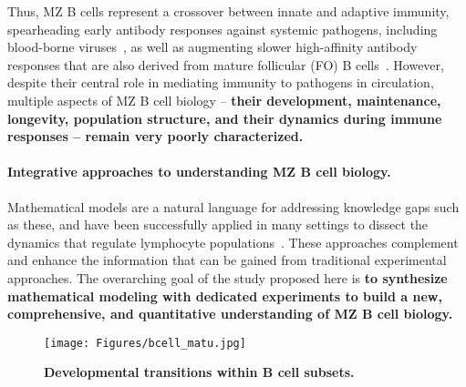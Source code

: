 \documentclass[11pt]{article}
\newcommand{\para}[1]{\vspace*{-4.5mm}\paragraph{#1}}
\begin{document}
Thus, MZ B cells represent a crossover between innate and adaptive immunity, spearheading early antibody responses against  systemic pathogens, including blood-borne viruses~\cite{Szomolanyi_Tsuda_1998, Gatto_2004}, as well as augmenting slower high-affinity antibody responses that are also derived from mature follicular (FO) B cells~\cite{Oliver_1999, Attanavanich_2004, Pone_2012}.
However, despite their central role in mediating immunity to pathogens in circulation, multiple aspects of MZ B cell biology -- \textbf{{their development, maintenance, longevity, population structure, and their dynamics during immune responses -- remain very poorly characterized.}}

\para{Integrative approaches to understanding MZ B cell biology.}
Mathematical models are a natural language for addressing knowledge gaps such as these, and have been successfully applied in many settings to dissect the dynamics that regulate lymphocyte populations~\cite{Thomas_Vaslin_1989, Rolink_1999, Asquith_2002, Antia_2005, Anderson_2009, Dowling_2009, Johnson_2012, Meyer-Hermann_2012, De_Boer_2013,  Westera_2013,   Gossel_2017, Hogan_2015, van_Hoeven_2017, Reynaldi_2019, Rane_2018, Mold_2019, Verheijen_2020, Rane_2022}.
These approaches complement and enhance the information that can be gained from traditional experimental approaches.
The overarching goal of the study proposed here is  \textbf{{to synthesize mathematical modeling with dedicated experiments to build a new,  comprehensive, and quantitative understanding of MZ B cell biology.}}

\begin{wrapfigure}{r}{0.3\textwidth}
\centering
\vspace*{-4mm}
\texttt{[image: Figures/bcell\_matu.jpg]}
\caption{\textbf{Developmental transitions within B cell subsets.}} %
\label{fig:MZ_dev}
\vspace*{-4mm}
\end{wrapfigure}
\end{document}
